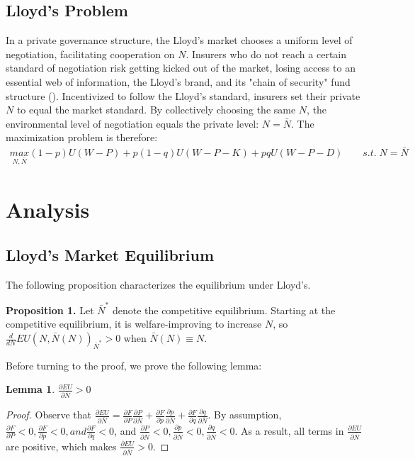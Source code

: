 \documentclass[12pt]{article}
\theoremstyle{plain}
\newtheorem{lemma}[theorem]{Lemma}
\begin{document}
\subsection{Lloyd's Problem}

In a private governance structure, the Lloyd's market chooses a uniform level of negotiation, facilitating cooperation on $N$. Insurers who do not reach a certain standard of negotiation risk getting kicked out of the market, losing access to an essential web of information, the Lloyd's brand, and its "chain of security" fund structure (). Incentivized to follow the Lloyd's standard, insurers set their private $N$ to equal the market standard. By collectively choosing the same $N$, the environmental level of negotiation equals the private level: $N = \bar{N}$. The maximization problem is therefore:
\begin{align*}
\underset{N, \bar{N}}{max} (1-p)U(W-P) + p(1-q)U(W-P-K) + pqU(W-P-D) \qquad s.t. \; N = \bar{N}
\end{align*}

\section{Analysis}

\subsection{Lloyd's Market Equilibrium} 

\noindent
The following proposition characterizes the equilibrium under Lloyd's. 

\bigskip
\noindent
\textbf{Proposition 1.} Let $\bar{N}^*$ denote the competitive equilibrium. Starting at the competitive equilibrium, it is welfare-improving to increase $N$, so $\frac{d}{dN}EU(N,\bar{N}(N))_{\bar{N}^*} > 0$ when $\bar{N}(N)\equiv N$.

\bigskip

\noindent
Before turning to the proof, we prove the following lemma:

\begin{lemma}
$\frac{\partial EU}{\partial \bar{N}} > 0$
\end{lemma}

\begin{proof}
Observe that $\frac{\partial EU}{\partial \bar{N}} = \frac{\partial F}{\partial P} \frac{\partial P}{\partial \bar{N}} + \frac{\partial F}{\partial p} \frac{\partial p}{\partial \bar{N}} + \frac{\partial F}{\partial q} \frac{\partial q}{\partial \bar{N}}$. By assumption, $\frac{\partial F}{\partial P} < 0, \frac{\partial F}{\partial p} < 0, and \frac{\partial F}{\partial q} < 0$, and $\frac{\partial P}{\partial \bar{N}} <0, \frac{\partial p}{\partial \bar{N}} < 0, \frac{\partial q}{\partial \bar{N}} < 0$. As a result, all terms in  $\frac{\partial EU}{\partial \bar{N}}$ are positive, which makes $\frac{\partial EU}{\partial \bar{N}} > 0$.
\end{proof}
\end{document}
